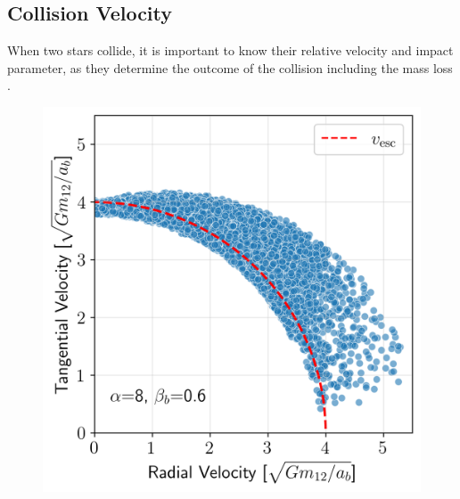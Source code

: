 \documentclass[twocolumn]{aastex631}
\begin{document}
\subsection{Collision Velocity}
\label{sec:collision velocity}

When two stars collide, it is important to know their relative velocity and impact parameter, as they determine the outcome of the collision including the mass loss \citep[e.g.,][]{Benz1987ApJ,Lai1993ApJ,Freitag2005MNRAS}.

\begin{figure}[htbp]
        \subfigure
        {
            \begin{minipage}[b]{0.95\linewidth} 
                \centering
                \includegraphics[width=\columnwidth]{figures/v_lowbeta.png}
            \end{minipage}
        }
        \subfigure
        {
            \begin{minipage}[b]{0.95\linewidth}
                \centering

\end{minipage}}
\end{figure}
\end{document}
